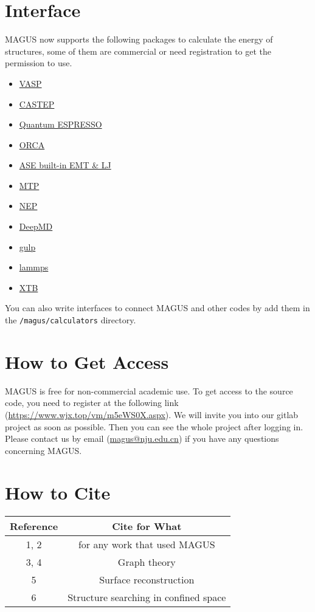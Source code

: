 \documentclass[12pt,oneside]{book}
\newcommand{\file}[1]{\texttt{#1}}
\begin{document}
\section{Interface}
MAGUS now supports the following packages to calculate the energy of structures, some of them are commercial or need registration to get the permission to use.
\begin{itemize}
    \item \href{https://www.vasp.at/}{VASP}
    \item \href{http://www.castep.org/}{CASTEP}
    \item \href{https://www.quantum-espresso.org/}{Quantum ESPRESSO}
    \item \href{https://orcaforum.kofo.mpg.de/app.php/portal}{ORCA}
    \item \href{https://wiki.fysik.dtu.dk/ase/ase/calculators/calculators.html#module-ase.calculators}{ASE built-in EMT \& LJ}
    \item \href{https://mlip.skoltech.ru/}{MTP}
    \item \href{https://gpumd.zheyongfan.org/index.php/Main_Page}{NEP}
    \item \href{https://docs.deepmodeling.com/projects/deepmd/en/master/index.html}{DeepMD}
    \item \href{https://gulp.curtin.edu.au/gulp/}{gulp}
    \item \href{https://www.lammps.org/}{lammps}
    \item \href{https://xtb-docs.readthedocs.io/en/latest/contents.html}{XTB}
\end{itemize}
You can also write interfaces to connect MAGUS and other codes by add them in the \file{/magus/calculators} directory.

\section{How to Get Access}
MAGUS is free for non-commercial academic use. To get access to the source code, you need to register at the following link (\url{https://www.wjx.top/vm/m5eWS0X.aspx}). We will invite you into our gitlab project as soon as possible. Then you can see the whole project after logging in. Please contact us by email (\href{mailto:magus@nju.edu.cn}{magus@nju.edu.cn}) if you have any questions concerning MAGUS.

\section{How to Cite}
\begin{table}[H]
    \centering
    \begin{tabular}{c|c}
    Reference    &   Cite for What  \\ \hline
    1, 2       &   for any work that used MAGUS \\
    3, 4       &   Graph theory \\
    5          &   Surface reconstruction \\
    6          &   Structure searching in confined space \\
    \end{tabular}
\end{table}
\end{document}
